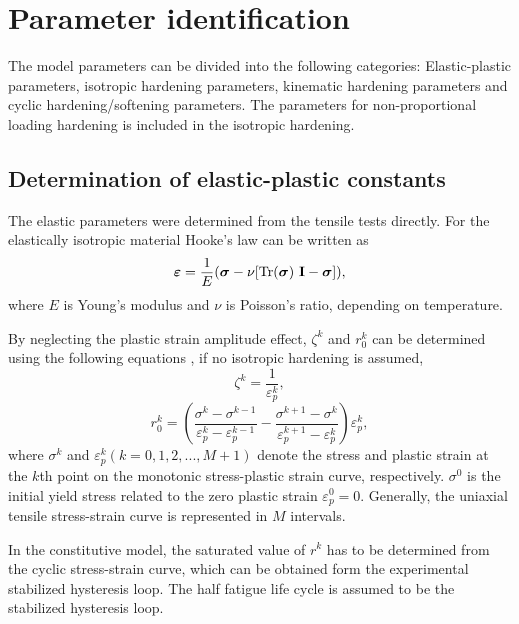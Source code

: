 \documentclass[preprint,5p,twocolumn,11pt,sort&compress]{elsarticle}
\newcommand{\bfsigma}{{\mbox{\boldmath{$\sigma$}}}}
\newcommand{\bfepsilon}{{\mbox{\boldmath{$\varepsilon$}}}}
\begin{document}
\section{Parameter identification}
\noindent
The model parameters can be divided into the following categories: Elastic-plastic parameters, isotropic hardening parameters, kinematic hardening parameters and cyclic hardening/softening parameters. The parameters for non-proportional loading hardening is included in the isotropic hardening.

\subsection{Determination of elastic-plastic constants}

\noindent
The elastic parameters were determined from the tensile tests directly. For the elastically isotropic material Hooke's law can be written as
\begin{eqnarray}
   \bfepsilon = \frac{1}{E}(\bfsigma - \nu[\mathrm{Tr}(\bfsigma)~\mathbf{I} - \bfsigma]),
\label{Equ:HookesLawInEandNu}
\end{eqnarray}
where $E$ is  Young's modulus and $\nu$ is Poisson's ratio, depending on temperature.

By neglecting the plastic strain amplitude effect, ${\zeta ^k}$ and  $r_0^k$ can be determined using the following equations \cite{Jiang1996387, jiang1996modeling}, if no isotropic hardening is assumed,
\begin{equation}
{\zeta ^k} = \frac{1}{{\varepsilon _p^k}},
\label{Eqn:zetak}
\end{equation}
\begin{equation}
r_0^k = \left( {\frac{{\sigma _{}^k - \sigma _{}^{k - 1}}}{{\varepsilon _p^k - \varepsilon _p^{k - 1}}} - \frac{{\sigma _{}^{k + 1} - \sigma _{}^k}}{{\varepsilon _p^{k + 1} - \varepsilon _p^k}}} \right)\varepsilon _p^k,
\end{equation}
where $\sigma^k$ and $\varepsilon_p^k( k = 0,1,2,...,M+1 )$ denote the stress and plastic strain at the $k$th point on the monotonic  stress-plastic strain curve, respectively. $\sigma^0$ is the initial yield stress related to the zero plastic strain $\varepsilon_p^0=0$. Generally, the uniaxial tensile stress-strain curve is represented in $M$ intervals.

In the constitutive model, the saturated value of $r^k$ has to be determined from the cyclic stress-strain curve, which can be obtained form the experimental stabilized hysteresis loop.
The half fatigue life cycle is assumed to be the stabilized hysteresis loop.
\end{document}
